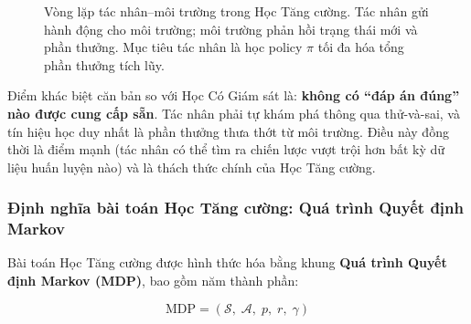 \begin{figure}[H]
    \centering
    \caption{Vòng lặp tác nhân--môi trường trong Học Tăng cường. Tác nhân gửi hành động
    cho môi trường; môi trường phản hồi trạng thái mới và phần thưởng.
    Mục tiêu tác nhân là học policy $\pi$ tối đa hóa tổng phần thưởng
    tích lũy.}
    \label{fig:rl-loop}
\end{figure}

Điểm khác biệt căn bản so với Học Có Giám sát là: \textbf{không
có ``đáp án đúng'' nào được cung cấp sẵn}. Tác nhân phải tự khám phá
thông qua thử-và-sai, và tín hiệu học duy nhất là phần thưởng thưa
thớt từ môi trường. Điều này đồng thời là điểm mạnh (tác nhân có thể
tìm ra chiến lược vượt trội hơn bất kỳ dữ liệu huấn luyện nào) và là
thách thức chính của Học Tăng cường.

\subsubsection{Định nghĩa bài toán Học Tăng cường: Quá trình Quyết định Markov}
 
Bài toán Học Tăng cường được hình thức hóa bằng khung
\textbf{Quá trình Quyết định Markov (MDP)}, bao gồm năm thành phần:
 
\begin{equation}
    \text{MDP} = (\mathcal{S},\; \mathcal{A},\; p,\; r,\; \gamma)
    \label{eq:mdp}
\end{equation}
 
